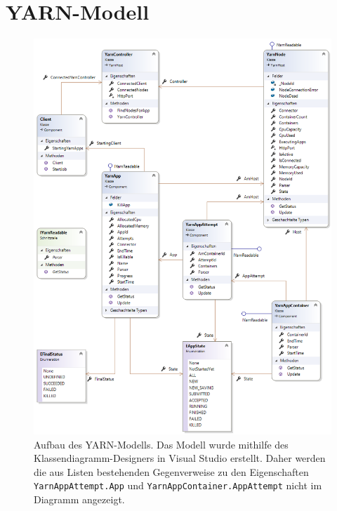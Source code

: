 \section{YARN-Modell}\label{sec:yarnModel}

\begin{figure}
	\centering
	\includegraphics[width=\columnwidth]{./images/yarnModel.png}
	\caption[Aufbau des YARN-Modells]{Aufbau des YARN-Modells. Das Modell wurde mithilfe des Klassendiagramm-Designers in Visual Studio erstellt. Daher werden die aus Listen bestehenden Gegenverweise zu den Eigenschaften \texttt{YarnAppAttempt.App} und \texttt{YarnAppContainer.AppAttempt} nicht im Diagramm angezeigt.}
	\label{fig:hdfsarch}
\end{figure}